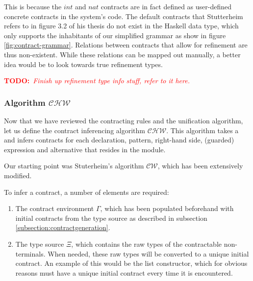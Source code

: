 \documentclass[10pt]{report}
\newcommand{\CHW}{$\mathcal{CHW}$}
\newcommand{\annotate}[3]{
	\begin{scriptsize}
	\textcolor{#1}{\textbf{#2}~\textit{#3}}
	\end{scriptsize}\newline}
\newcommand{\todo}[1]{\annotate{red} {TODO:} {#1}}
\newcommand{\code}[1]{%
  {%
   \setlength{\fboxsep}{-2\fboxrule}%
   \fcolorbox{black}{light-gray}{\hspace{1.5pt}\strut\texttt{#1}\hspace{1.5pt}}%
  }%
}
\begin{document}
This is because the $int$ and $nat$ contracts are in fact defined as user-defined concrete contracts in the system's code.
The default contracts that Stutterheim refers to in figure 3.2 of his thesis do not exist in the Haskell data type, which only supports the inhabitants of our simplified grammar as show in figure \ref{fig:contract-grammar}.
Relations between contracts that allow for refinement are thus non-existent.
While these relations can be mapped out manually, a better idea would be to look towards true refinement types. \todo{Finish up refinement type info stuff, refer to it here.}


\subsubsection{Algorithm \CHW}
Now that we have reviewed the contracting rules and the unification algorithm, let us define the contract inferencing algorithm \CHW.
This algorithm takes a \code{Module} and infers contracts for each declaration, pattern, right-hand side, (guarded) expression and alternative that resides in the module.

Our starting point was Stuterheim's algorithm $\mathcal{CW}$, which has been extensively modified.

To infer a contract, a number of elements are required:
\begin{enumerate}
	\item The contract environment $\Gamma$, which has been populated beforehand with initial contracts from the type source as described in subsection \ref{subsection:contractgeneration}.
	\item The type source $\Xi$, which contains the raw types of the contractable non-terminals. When needed, these raw types will be converted to a unique initial contract. An example of this would be the list constructor, which for obvious reasons must have a unique initial contract every time it is encountered.
\end{enumerate}
\end{document}
